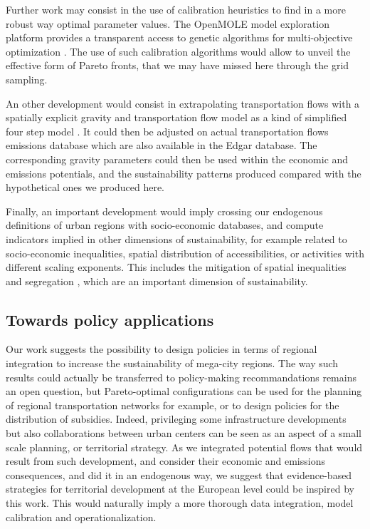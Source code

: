\documentclass{jimis-en}
\begin{document}
Further work may consist in the use of calibration heuristics to find in a more robust way optimal parameter values. The OpenMOLE model exploration platform provides a transparent access to genetic algorithms for multi-objective optimization \citep{reuillon2013openmole}. The use of such calibration algorithms would allow to unveil the effective form of Pareto fronts, that we may have missed here through the grid sampling.


An other development would consist in extrapolating transportation flows with a spatially explicit gravity and transportation flow model as a kind of simplified four step model \citep{mcnally2000four}. It could then be adjusted on actual transportation flows emissions database which are also available in the Edgar database. The corresponding gravity parameters could then be used within the economic and emissions potentials, and the sustainability patterns produced compared with the hypothetical ones we produced here.

Finally, an important development would imply crossing our endogenous definitions of urban regions with socio-economic databases, and compute indicators implied in other dimensions of sustainability, for example related to socio-economic inequalities, spatial distribution of accessibilities, or activities with different scaling exponents. This includes the mitigation of spatial inequalities and segregation \citep{tammaru2015multi}, which are an important dimension of sustainability.



\subsection{Towards policy applications}


Our work suggests the possibility to design policies in terms of regional integration to increase the sustainability of mega-city regions. The way such results could actually be transferred to policy-making recommandations remains an open question, but Pareto-optimal configurations can be used for the planning of regional transportation networks for example, or to design policies for the distribution of subsidies. Indeed, privileging some infrastructure developments but also collaborations between urban centers can be seen as an aspect of a small scale planning, or territorial strategy. As we integrated potential flows that would result from such development, and consider their economic and emissions consequences, and did it in an endogenous way, we suggest that evidence-based strategies for territorial development at the European level could be inspired by this work. This would naturally imply a more thorough data integration, model calibration and operationalization.
\end{document}
